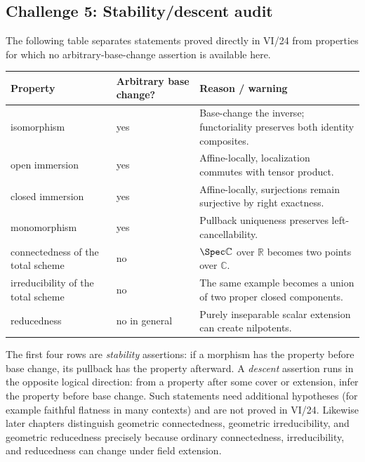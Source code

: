 \subsection*{Challenge 5: Stability/descent audit}
\begin{solution}
The following table separates statements proved directly in VI/24 from properties for which no arbitrary-base-change assertion is available here.
\begin{center}
\small
\begin{tabular}{p{}p{}p{}}
\raggedright\textbf{Property} & \raggedright\textbf{Arbitrary base change?} & \raggedright\textbf{Reason / warning}\tabularnewline\hline
\raggedright isomorphism & \raggedright yes & \raggedright Base-change the inverse; functoriality preserves both identity composites.\tabularnewline
\raggedright open immersion & \raggedright yes & \raggedright Affine-locally, localization commutes with tensor product.\tabularnewline
\raggedright closed immersion & \raggedright yes & \raggedright Affine-locally, surjections remain surjective by right exactness.\tabularnewline
\raggedright monomorphism & \raggedright yes & \raggedright Pullback uniqueness preserves left-cancellability.\tabularnewline
\raggedright connectedness of the total scheme & \raggedright no & \raggedright $\Spec\mathbb C$ over $\mathbb R$ becomes two points over $\mathbb C$.\tabularnewline
\raggedright irreducibility of the total scheme & \raggedright no & \raggedright The same example becomes a union of two proper closed components.\tabularnewline
\raggedright reducedness & \raggedright no in general & \raggedright Purely inseparable scalar extension can create nilpotents.\tabularnewline
\end{tabular}
\end{center}
The first four rows are \emph{stability} assertions: if a morphism has the property before base change, its pullback has the property afterward.  A \emph{descent} assertion runs in the opposite logical direction: from a property after some cover or extension, infer the property before base change.  Such statements need additional hypotheses (for example faithful flatness in many contexts) and are not proved in VI/24.  Likewise later chapters distinguish geometric connectedness, geometric irreducibility, and geometric reducedness precisely because ordinary connectedness, irreducibility, and reducedness can change under field extension.
\end{solution}
